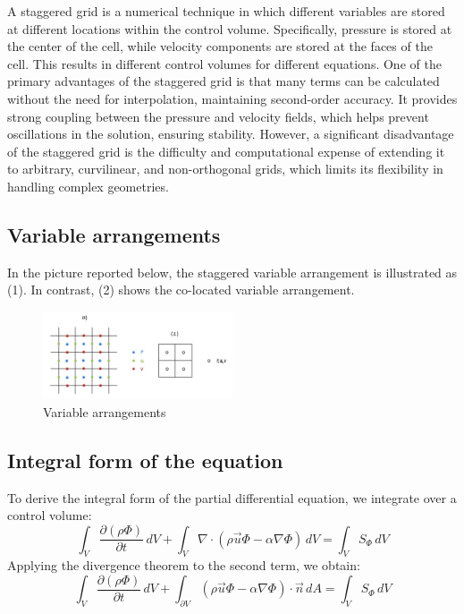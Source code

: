 \documentclass{article}
\begin{document}
A staggered grid is a numerical technique in which different variables are stored at different locations within the control volume. 
Specifically, pressure is stored at the center of the cell, while velocity components are stored at the faces of the cell. This results in 
different control volumes for different equations. One of the primary advantages of the staggered grid is that many terms can be calculated 
without the need for interpolation, maintaining second-order accuracy. It provides strong coupling between the pressure and velocity fields, 
which helps prevent oscillations in the solution, ensuring stability. However, a significant disadvantage of the staggered grid is the difficulty 
and computational expense of extending it to arbitrary, curvilinear, and non-orthogonal grids, which limits its flexibility in handling complex geometries.

\subsection{Variable arrangements}

In the picture reported below, the staggered variable arrangement is illustrated as (1). In contrast, (2) shows the co-located variable arrangement.

\begin{figure}[h!]
  \centering
  \includegraphics[width=0.5\textwidth]{Variable.jpg}
  \caption{Variable arrangements}
\end{figure}

\subsection{Integral form of the equation}

To derive the integral form of the partial differential equation, we integrate over a control volume:
\[
\int_V \frac{\partial (\rho \Phi)}{\partial t} \, dV + \int_V \nabla \cdot (\rho \vec{u} \Phi - \alpha \nabla \Phi) \, dV = \int_V S_\Phi \, dV
\]
Applying the divergence theorem to the second term, we obtain:
\[
\int_V \frac{\partial (\rho \Phi)}{\partial t} \, dV + \int_{\partial V} (\rho \vec{u} \Phi - \alpha \nabla \Phi) \cdot \vec{n} \, dA = \int_V S_\Phi \, dV
\]
\end{document}

